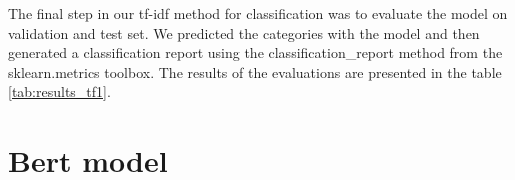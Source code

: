 \documentclass[fleqn,moreauthors,10pt]{ds_report}
\begin{document}
The final step in our tf-idf method for classification was to evaluate the model on validation and test set. We predicted the categories with the model and then generated a classification report using the classification\_report method from the sklearn.metrics toolbox. The results of the evaluations are presented in the table \ref{tab:results_tf1}.

\begin{table}[htbp]
    \centering
\vspace{0.2cm}
\caption{Results of the validation set and test set evaluations}
\label{tab:results_tf1}
\end{table}

\section*{Bert model}

\end{document}
